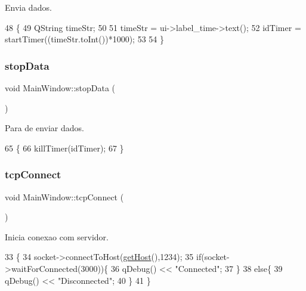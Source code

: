 Envia dados. 


\begin{DoxyCode}
48                         \{
49     QString timeStr;
50  
51     timeStr = ui->label\_time->text();
52     idTimer = startTimer((timeStr.toInt())*1000);
53  
54 \}
\end{DoxyCode}
\mbox{\label{class_main_window_a79fdaf1fd769f0584f50da34e415b3de}} 
\subsubsection{\texorpdfstring{stop\+Data}{stopData}}
{\footnotesize\ttfamily void Main\+Window\+::stop\+Data (\begin{DoxyParamCaption}{ }\end{DoxyParamCaption})\hspace{0.3cm}{\ttfamily [slot]}}



Para de enviar dados. 


\begin{DoxyCode}
65                          \{
66     killTimer(idTimer);
67 \}
\end{DoxyCode}
\mbox{\label{class_main_window_ac5b669957c442b6eb68573dacfce33e1}} 
\subsubsection{\texorpdfstring{tcp\+Connect}{tcpConnect}}
{\footnotesize\ttfamily void Main\+Window\+::tcp\+Connect (\begin{DoxyParamCaption}{ }\end{DoxyParamCaption})\hspace{0.3cm}{\ttfamily [slot]}}



Inicia conexao com servidor. 


\begin{DoxyCode}
33                            \{
34     socket->connectToHost(\mbox{\hyperlink{class_main_window_a57a1f8959ed5f0eee73281829b2331fa}{getHost}}(),1234);
35     \textcolor{keywordflow}{if}(socket->waitForConnected(3000))\{
36         qDebug() << \textcolor{stringliteral}{"Connected"};
37     \}
38     \textcolor{keywordflow}{else}\{
39         qDebug() << \textcolor{stringliteral}{"Disconnected"};
40     \}
41 \}
\end{DoxyCode}
\mbox{\label{class_main_window_a4d22c4c7afc7ba0a2fa4c70515c85dda}} 
